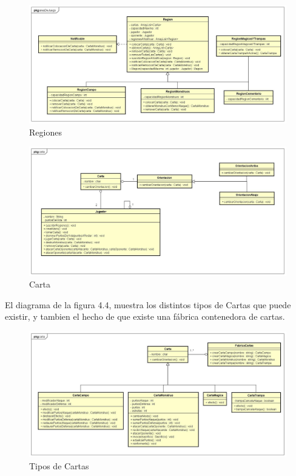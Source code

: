 \begin{figure}[H]
	\centering
	\includegraphics[scale=0.3]{includes/areaDeJuego}
	\caption{Regiones}
	\label{areaDeJuego}
\end{figure}



\begin{figure}[H]
	\centering
	\includegraphics[scale=0.3]{includes/Carta}
	\caption{Carta}
	\label{Cartas}
\end{figure}

El diagrama de la figura 4.4, muestra los distintos tipos de Cartas que puede existir, y tambien el hecho de que existe una fábrica contenedora de cartas.

\begin{figure}[H]
	\centering
	\includegraphics[scale=0.3]{includes/Carta2}
	\caption{Tipos de Cartas}
	\label{TiposCarta}
\end{figure}

